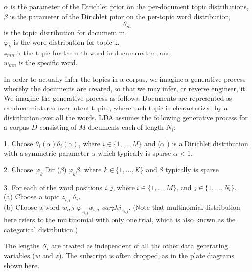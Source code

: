 $\alpha$ is the parameter of the Dirichlet prior on the per-document topic distributions,\\
$\beta$ is the parameter of the Dirichlet prior on the per-topic word distribution,\\
\[{\theta_{m}}\] is the topic distribution for document m,\\
$\varphi_{k}$ is the word distribution for topic k,\\
$z_{mn}$ is the topic for the n-th word in documenxt m, and \\
$w_{mn}$ is the specific word.


In order to actually infer the topics in a corpus, we imagine a generative process whereby the documents are created, so that we may infer, or reverse engineer, it. We imagine the generative process as follows. Documents are represented as random mixtures over latent topics, where each topic is characterized by a distribution over all the words. LDA assumes the following generative process for a corpus $D$ consisting of $M$ documents each of length $N_{i}$:

1. Choose $\theta _{i}(\alpha ) \theta _{i} (\alpha)$, where $i\in \{1,\dots ,M\}$ and ($\alpha$ ) is a Dirichlet distribution with a symmetric parameter $\alpha$ which typically is sparse $\alpha$ < 1.

2. Choose $\varphi _{k}$ {Dir} ($\beta$) $\varphi _{k} \beta$, where $k\in \{1,\dots ,K\}$ and $\beta$ typically is sparse

3. For each of the word positions $i,j$, where $i\in \{1,\dots ,M\}$, and $j\in \{1,\dots ,N_{i}\}$. \\

(a) Choose a topic $z_{i,j}$ $\theta_{i}$.\\
(b) Choose a word $w_i,j$ $\varphi_{z_{i,j}} w_{i,j}$ $varphi _{z_{i,j}}$.
(Note that multinomial distribution here refers to the multinomial with only one trial, which is also known as the categorical distribution.)

The lengths $N_{i}$ are treated as independent of all the other data generating variables ($w$ and $z$). The subscript is often dropped, as in the plate diagrams shown here.


